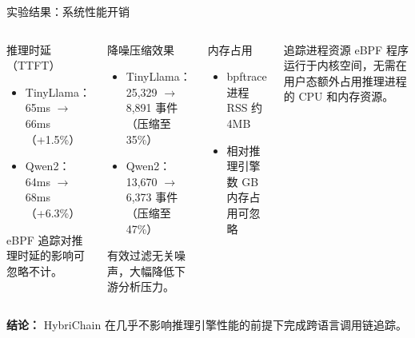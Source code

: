 \documentclass[aspectratio=169, 10pt]{beamer}
\begin{document}
\begin{frame}{实验结果：系统性能开销}
    \begin{columns}
        \begin{block}{推理时延（TTFT）}
            \begin{itemize}
                \item TinyLlama：65ms $\to$ 66ms（+1.5\%）
                \item Qwen2：64ms $\to$ 68ms（+6.3\%）
            \end{itemize}
            eBPF 追踪对推理时延的影响可忽略不计。
        \end{block}

        \begin{block}{降噪压缩效果}
            \begin{itemize}
                \item TinyLlama：25,329 $\to$ 8,891 事件（压缩至 35\%）
                \item Qwen2：13,670 $\to$ 6,373 事件（压缩至 47\%）
            \end{itemize}
            有效过滤无关噪声，大幅降低下游分析压力。
        \end{block}

        \begin{block}{内存占用}
            \begin{itemize}
                \item bpftrace 进程 RSS 约 4MB
                \item 相对推理引擎数 GB 内存占用可忽略
            \end{itemize}
        \end{block}

        \begin{block}{追踪进程资源}
            eBPF 程序运行于内核空间，无需在用户态额外占用推理进程的 CPU 和内存资源。
        \end{block}
    \end{columns}

    \vspace{0.5em}
    \textbf{结论：} HybriChain 在几乎不影响推理引擎性能的前提下完成跨语言调用链追踪。
\end{frame}
\end{document}
